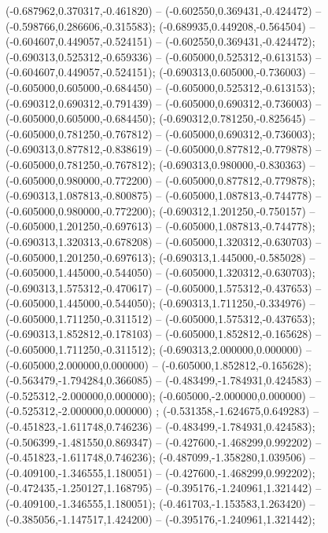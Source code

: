  (-0.687962,0.370317,-0.461820) -- (-0.602550,0.369431,-0.424472) -- (-0.598766,0.286606,-0.315583);
 (-0.689935,0.449208,-0.564504) -- (-0.604607,0.449057,-0.524151) -- (-0.602550,0.369431,-0.424472);
 (-0.690313,0.525312,-0.659336) -- (-0.605000,0.525312,-0.613153) -- (-0.604607,0.449057,-0.524151);
 (-0.690313,0.605000,-0.736003) -- (-0.605000,0.605000,-0.684450) -- (-0.605000,0.525312,-0.613153);
 (-0.690312,0.690312,-0.791439) -- (-0.605000,0.690312,-0.736003) -- (-0.605000,0.605000,-0.684450);
 (-0.690312,0.781250,-0.825645) -- (-0.605000,0.781250,-0.767812) -- (-0.605000,0.690312,-0.736003);
 (-0.690313,0.877812,-0.838619) -- (-0.605000,0.877812,-0.779878) -- (-0.605000,0.781250,-0.767812);
 (-0.690313,0.980000,-0.830363) -- (-0.605000,0.980000,-0.772200) -- (-0.605000,0.877812,-0.779878);
 (-0.690313,1.087813,-0.800875) -- (-0.605000,1.087813,-0.744778) -- (-0.605000,0.980000,-0.772200);
 (-0.690312,1.201250,-0.750157) -- (-0.605000,1.201250,-0.697613) -- (-0.605000,1.087813,-0.744778);
 (-0.690313,1.320313,-0.678208) -- (-0.605000,1.320312,-0.630703) -- (-0.605000,1.201250,-0.697613);
 (-0.690313,1.445000,-0.585028) -- (-0.605000,1.445000,-0.544050) -- (-0.605000,1.320312,-0.630703);
 (-0.690313,1.575312,-0.470617) -- (-0.605000,1.575312,-0.437653) -- (-0.605000,1.445000,-0.544050);
 (-0.690313,1.711250,-0.334976) -- (-0.605000,1.711250,-0.311512) -- (-0.605000,1.575312,-0.437653);
 (-0.690313,1.852812,-0.178103) -- (-0.605000,1.852812,-0.165628) -- (-0.605000,1.711250,-0.311512);
 (-0.690313,2.000000,0.000000) -- (-0.605000,2.000000,0.000000) -- (-0.605000,1.852812,-0.165628);
 (-0.563479,-1.794284,0.366085) -- (-0.483499,-1.784931,0.424583) -- (-0.525312,-2.000000,0.000000);
 (-0.605000,-2.000000,0.000000) -- (-0.525312,-2.000000,0.000000) ;
 (-0.531358,-1.624675,0.649283) -- (-0.451823,-1.611748,0.746236) -- (-0.483499,-1.784931,0.424583);
 (-0.506399,-1.481550,0.869347) -- (-0.427600,-1.468299,0.992202) -- (-0.451823,-1.611748,0.746236);
 (-0.487099,-1.358280,1.039506) -- (-0.409100,-1.346555,1.180051) -- (-0.427600,-1.468299,0.992202);
 (-0.472435,-1.250127,1.168795) -- (-0.395176,-1.240961,1.321442) -- (-0.409100,-1.346555,1.180051);
 (-0.461703,-1.153583,1.263420) -- (-0.385056,-1.147517,1.424200) -- (-0.395176,-1.240961,1.321442);
